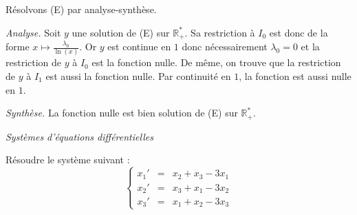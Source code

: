 \documentclass[a4paper,10pt]{report}
\begin{document}
\medskip

\noindent Résolvons (E) par analyse-synthèse.

\medskip

\noindent \textit{Analyse.} Soit $y$ une solution de (E) sur $\mathbb R_+^*$. Sa restriction à $I_0$ est donc de la forme $x \mapsto \frac{\lambda_0}{\ln (x)}$. Or $y$ est continue en $1$ donc nécessairement $\lambda_0 = 0$ et la restriction de $y$ à $I_0$ est la fonction nulle. De même, on trouve que la restriction de $y$ à $I_1$ est aussi la fonction nulle. Par continuité en $1$, la fonction est aussi nulle en $1$.

\medskip

\noindent \textit{Synthèse.} La fonction nulle est bien solution de (E) sur $\mathbb R_+^*$. 

\medskip

\begin{center}
\textit{{ {\large Systèmes d'équations différentielles}}}
\end{center}

\medskip

\begin{Exa} Résoudre le système suivant :
$$\left\{\begin{array}{rcl}
x_1' & = & x_2 + x_3 - 3x_1 \\
x_2' & = & x_3 + x_1 -3 x_2 \\
x_3' &= & x_1 + x_2 -3 x_3\end{array}\right.$$
\end{Exa}
\end{document}
